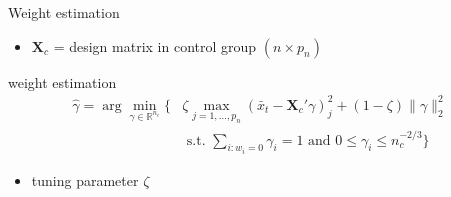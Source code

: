 \documentclass[xcolor=dvipsnames]{beamer}
\begin{document}
\begin{frame}{Weight estimation}
\begin{itemize}
  \item $\mathbf{X}_c$ = design matrix in control group $(n \times p_n)$
\end{itemize}
weight estimation
\begin{align*}
  \hat{\gamma} = \arg \min_{\gamma \in \mathbb{R}^{n_c}} 
  \Big\{ &
    \zeta \max_{j = 1, \dotsc, p_n} (\bar{x}_t - \mathbf{X}_c' \gamma)_j^2 + (1 - \zeta) \lVert  \gamma \rVert_2^2
  \\
    & \text{ s.t. } \sum_{i : w_i = 0} \gamma_i = 1 \text{ and } 0 \leq \gamma_i \leq n_c^{-2/3}
  \Big\}
\end{align*}
\begin{itemize}
  \item tuning parameter $\zeta$
\end{itemize}
\end{frame}

\appendix
\end{document}
